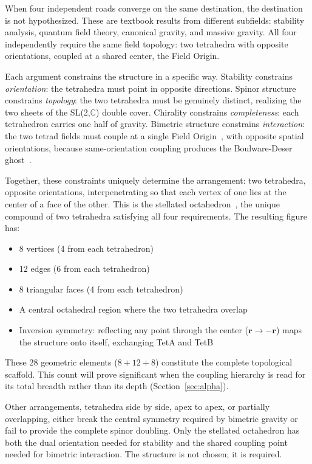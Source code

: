 \documentclass[aps,prd,preprint,superscriptaddress,showpacs,preprintnumbers,amsmath,amssymb,nofootinbib]{revtex4-2}
\begin{document}
When four independent roads converge on the same destination, the destination is not hypothesized. These are textbook results from different subfields: stability analysis, quantum field theory, canonical gravity, and massive gravity. All four independently require the same field topology: two tetrahedra with opposite orientations, coupled at a shared center, the Field Origin.

Each argument constrains the structure in a specific way. Stability constrains \emph{orientation}: the tetrahedra must point in opposite directions. Spinor structure constrains \emph{topology}: the two tetrahedra must be genuinely distinct, realizing the two sheets of the SL(2,$\mathbb{C}$) double cover. Chirality constrains \emph{completeness}: each tetrahedron carries one half of gravity. Bimetric structure constrains \emph{interaction}: the two tetrad fields must couple at a single Field Origin~\cite{hinterbichler2012}, with opposite spatial orientations, because same-orientation coupling produces the Boulware-Deser ghost~\cite{boulware1972}.

Together, these constraints uniquely determine the arrangement: two tetrahedra, opposite orientations, interpenetrating so that each vertex of one lies at the center of a face of the other. This is the stellated octahedron~\cite{coxeter1973}, the unique compound of two tetrahedra satisfying all four requirements. The resulting figure has:
\begin{itemize}
\item 8 vertices (4 from each tetrahedron)
\item 12 edges (6 from each tetrahedron)
\item 8 triangular faces (4 from each tetrahedron)
\item A central octahedral region where the two tetrahedra overlap
\item Inversion symmetry: reflecting any point through the center ($\mathbf{r} \to -\mathbf{r}$) maps the structure onto itself, exchanging TetA and TetB
\end{itemize}

\noindent
These 28 geometric elements ($8 + 12 + 8$) constitute the complete topological scaffold. This count will prove significant when the coupling hierarchy is read for its total breadth rather than its depth (Section~\ref{sec:alpha}).

Other arrangements, tetrahedra side by side, apex to apex, or partially overlapping, either break the central symmetry required by bimetric gravity or fail to provide the complete spinor doubling. Only the stellated octahedron has both the dual orientation needed for stability and the shared coupling point needed for bimetric interaction. The structure is not chosen; it is required.
\end{document}
